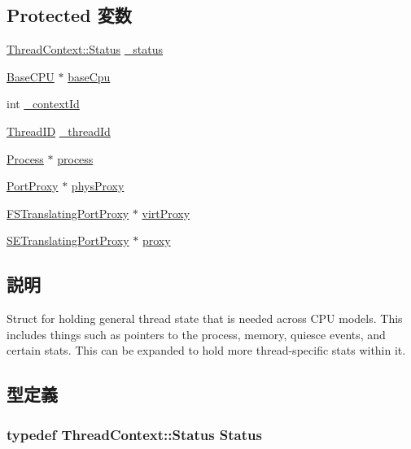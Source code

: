\subsection*{Protected 変数}
\begin{DoxyCompactItemize}
\item 
\hyperlink{classThreadContext_a67a0db04d321a74b7e7fcfd3f1a3f70b}{ThreadContext::Status} \hyperlink{structThreadState_ac749a0cabd0ad3556ddabdfe50040d3e}{\_\-status}
\item 
\hyperlink{classBaseCPU}{BaseCPU} $\ast$ \hyperlink{structThreadState_adb939b26e0dd28db6717cc3f68c295a8}{baseCpu}
\item 
int \hyperlink{structThreadState_a4fea6f718ae601dc81fce73e88774682}{\_\-contextId}
\item 
\hyperlink{base_2types_8hh_ab39b1a4f9dad884694c7a74ed69e6a6b}{ThreadID} \hyperlink{structThreadState_ad3b029723cc658ac9923dbce5c6822c4}{\_\-threadId}
\item 
\hyperlink{classProcess}{Process} $\ast$ \hyperlink{structThreadState_a075e3da8f2570b13cecbbffca7e30d1a}{process}
\item 
\hyperlink{classPortProxy}{PortProxy} $\ast$ \hyperlink{structThreadState_a1020d50e51f5a51af704e2a92c228f76}{physProxy}
\item 
\hyperlink{classFSTranslatingPortProxy}{FSTranslatingPortProxy} $\ast$ \hyperlink{structThreadState_ab11736157caa6832ca24df48ef3b06db}{virtProxy}
\item 
\hyperlink{classSETranslatingPortProxy}{SETranslatingPortProxy} $\ast$ \hyperlink{structThreadState_ac7d5f54aedf1b7a6679e114de0fe6fb4}{proxy}
\end{DoxyCompactItemize}


\subsection{説明}
Struct for holding general thread state that is needed across CPU models. This includes things such as pointers to the process, memory, quiesce events, and certain stats. This can be expanded to hold more thread-\/specific stats within it. 

\subsection{型定義}
\hypertarget{structThreadState_a3af29dcea6d2bbb0a1de56f02ec789f1}{
\subsubsection[{Status}]{\setlength{\rightskip}{0pt plus 5cm}typedef {\bf ThreadContext::Status} {\bf Status}}}
\label{structThreadState_a3af29dcea6d2bbb0a1de56f02ec789f1}


